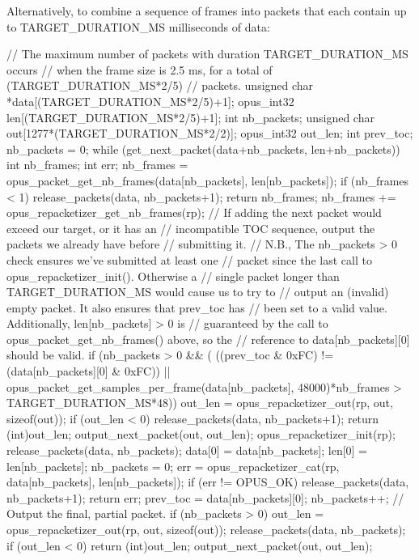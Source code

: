 Alternatively, to combine a sequence of frames into packets that each contain up to {\ttfamily TARGET\_\-DURATION\_\-MS} milliseconds of data: 
\begin{DoxyCode}
 // The maximum number of packets with duration TARGET_DURATION_MS occurs
 // when the frame size is 2.5 ms, for a total of (TARGET_DURATION_MS*2/5)
 // packets.
 unsigned char *data[(TARGET_DURATION_MS*2/5)+1];
 opus_int32 len[(TARGET_DURATION_MS*2/5)+1];
 int nb_packets;
 unsigned char out[1277*(TARGET_DURATION_MS*2/2)];
 opus_int32 out_len;
 int prev_toc;
 nb_packets = 0;
 while (get_next_packet(data+nb_packets, len+nb_packets))
 {
   int nb_frames;
   int err;
   nb_frames = opus_packet_get_nb_frames(data[nb_packets], len[nb_packets]);
   if (nb_frames < 1)
   {
     release_packets(data, nb_packets+1);
     return nb_frames;
   }
   nb_frames += opus_repacketizer_get_nb_frames(rp);
   // If adding the next packet would exceed our target, or it has an
   // incompatible TOC sequence, output the packets we already have before
   // submitting it.
   // N.B., The nb_packets > 0 check ensures we've submitted at least one
   // packet since the last call to opus_repacketizer_init(). Otherwise a
   // single packet longer than TARGET_DURATION_MS would cause us to try to
   // output an (invalid) empty packet. It also ensures that prev_toc has
   // been set to a valid value. Additionally, len[nb_packets] > 0 is
   // guaranteed by the call to opus_packet_get_nb_frames() above, so the
   // reference to data[nb_packets][0] should be valid.
   if (nb_packets > 0 && (
       ((prev_toc & 0xFC) != (data[nb_packets][0] & 0xFC)) ||
       opus_packet_get_samples_per_frame(data[nb_packets], 48000)*nb_frames >
       TARGET_DURATION_MS*48))
   {
     out_len = opus_repacketizer_out(rp, out, sizeof(out));
     if (out_len < 0)
     {
        release_packets(data, nb_packets+1);
        return (int)out_len;
     }
     output_next_packet(out, out_len);
     opus_repacketizer_init(rp);
     release_packets(data, nb_packets);
     data[0] = data[nb_packets];
     len[0] = len[nb_packets];
     nb_packets = 0;
   }
   err = opus_repacketizer_cat(rp, data[nb_packets], len[nb_packets]);
   if (err != OPUS_OK)
   {
     release_packets(data, nb_packets+1);
     return err;
   }
   prev_toc = data[nb_packets][0];
   nb_packets++;
 }
 // Output the final, partial packet.
 if (nb_packets > 0)
 {
   out_len = opus_repacketizer_out(rp, out, sizeof(out));
   release_packets(data, nb_packets);
   if (out_len < 0)
     return (int)out_len;
   output_next_packet(out, out_len);
 }
\end{DoxyCode}


